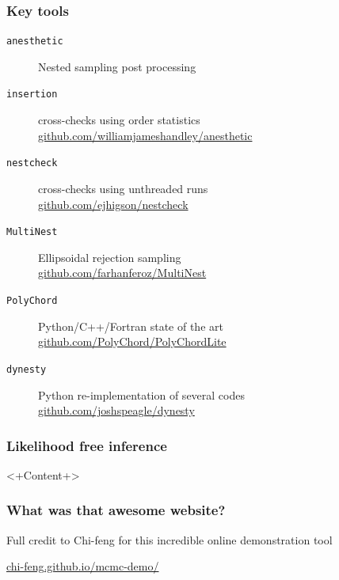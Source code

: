 \documentclass[aspectratio=169]{beamer}
\begin{document}
\begin{frame}
    \frametitle{Key tools}
    \begin{description}
        \item[\texttt{anesthetic}] Nested sampling post processing \\
        \item[\texttt{insertion}] cross-checks using order statistics 
            \hspace{5pt}\url{github.com/williamjameshandley/anesthetic}
        \item[\texttt{nestcheck}] cross-checks using unthreaded runs \\
            \hspace{5pt}\url{github.com/ejhigson/nestcheck}
        \item[\texttt{MultiNest}] Ellipsoidal rejection sampling \\
            \hspace{5pt}\url{github.com/farhanferoz/MultiNest}
        \item[\texttt{PolyChord}] Python/C++/Fortran state of the art \\
            \hspace{5pt}\url{github.com/PolyChord/PolyChordLite} 
        \item[\texttt{dynesty}] Python re-implementation of several codes \\
            \hspace{5pt}\url{github.com/joshspeagle/dynesty}
    \end{description}
\end{frame}


\begin{frame}
    \frametitle{Likelihood free inference}
    <+Content+>
\end{frame}

\begin{frame}
    \frametitle{What was that awesome website?} 
    Full credit to Chi-feng for this incredible online demonstration tool

    \href{https://chi-feng.github.io/mcmc-demo/}{chi-feng.github.io/mcmc-demo/}
\end{frame}
\end{document}
